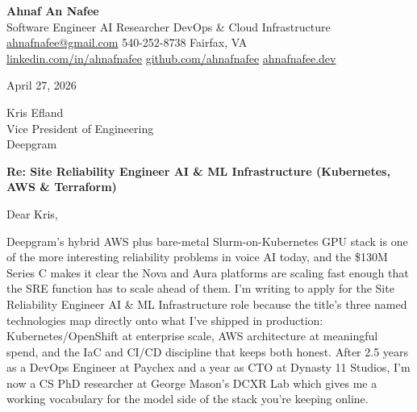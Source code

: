 \documentclass[letterpaper,11pt]{article}
\begin{document}
\begin{center}
  {\LARGE\bfseries\color{accent} Ahnaf An Nafee }\\[3pt]
  {\small Software Engineer \textbar{} AI Researcher \textbar{} DevOps \& Cloud Infrastructure }\\[4pt]
  \small
  \href{mailto:ahnafnafee@gmail.com}{ahnafnafee@gmail.com} \textbar{}
  540-252-8738 \textbar{}
  Fairfax, VA\\
  \href{https://linkedin.com/in/ahnafnafee}{linkedin.com/in/ahnafnafee} \textbar{}
  \href{https://github.com/ahnafnafee}{github.com/ahnafnafee} \textbar{}
  \href{https://www.ahnafnafee.dev}{ahnafnafee.dev}
\end{center}

\vspace{20pt}

April 27, 2026

Kris Efland\\Vice President of Engineering\\Deepgram

\textbf{Re: Site Reliability Engineer \textendash{} AI \& ML Infrastructure (Kubernetes, AWS \& Terraform)}

Dear Kris,

Deepgram's hybrid AWS plus bare-metal Slurm-on-Kubernetes GPU stack is one of the more interesting reliability problems in voice AI today, and the \$130M Series C makes it clear the Nova and Aura platforms are scaling fast enough that the SRE function has to scale ahead of them. I'm writing to apply for the Site Reliability Engineer \textendash{} AI \& ML Infrastructure role because the title's three named technologies map directly onto what I've shipped in production: Kubernetes/OpenShift at enterprise scale, AWS architecture at meaningful spend, and the IaC and CI/CD discipline that keeps both honest. After 2.5 years as a DevOps Engineer at Paychex and a year as CTO at Dynasty 11 Studios, I'm now a CS PhD researcher at George Mason's DCXR Lab \textendash{} which gives me a working vocabulary for the model side of the stack you're keeping online.
\end{document}
